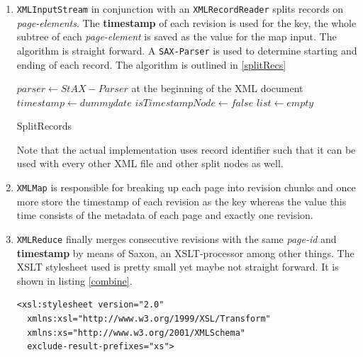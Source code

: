 \begin{enumerate}
\item \texttt{XMLInputStream} in conjunction with an \texttt{XMLRecordReader} splits records on \emph{page-elements}. The \textbf{timestamp} of each revision is used for the key, the whole subtree of each \emph{page-element} is saved as the value for the map input. The algorithm is straight forward. A \texttt{SAX-Parser} is used to determine starting and ending of each record. The algorithm is outlined in \ref{splitRecs}


\begin{algorithm}[Hhtbp]
{}
$parser \leftarrow StAX-Parser$ at the beginning of the XML document\;
$timestamp \leftarrow dummydate$\;
$isTimestampNode \leftarrow false$\;
$list \leftarrow empty$\;
\caption{SplitRecords}\label{splitRecs}
\end{algorithm}

Note that the actual implementation uses record identifier such that it can be used with every other XML file and other split nodes as well.

\item \texttt{XMLMap} is responsible for breaking up each page into revision chunks and once more store the timestamp of each revision as the key whereas the value this time consists of the metadata of each page and exactly one revision.
\item \texttt{XMLReduce} finally merges consecutive revisions with the same \emph{page-id} and \textbf{timestamp} by means of Saxon, an XSLT-processor among other things. The XSLT stylesheet used is pretty small yet maybe not straight forward. It is shown in listing \ref{combine}.

\begin{lstlisting}[caption=XSLT stylesheet to combine consecutive pages/revisions]
<xsl:stylesheet version="2.0" 
  xmlns:xsl="http://www.w3.org/1999/XSL/Transform" 
  xmlns:xs="http://www.w3.org/2001/XMLSchema"
  exclude-result-prefixes="xs">


\end{lstlisting}
\end{enumerate}
